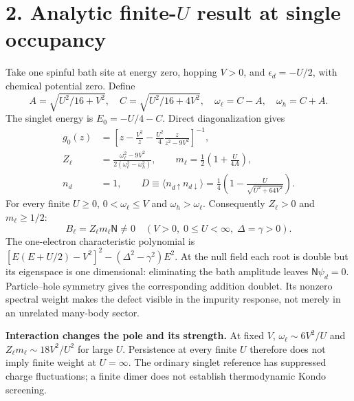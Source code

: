 \documentclass[11pt,a4paper]{article}
\newcommand{\N}{\mathsf N}
\begin{document}
\section*{2. Analytic finite-$U$ result at single occupancy}
Take one spinful bath site at energy zero, hopping $V>0$, and
$\epsilon_d=-U/2$, with chemical potential zero. Define
\begin{equation}
 A=\sqrt{U^2/16+V^2},\quad C=\sqrt{U^2/16+4V^2},\quad
 \omega_\ell=C-A,\quad\omega_h=C+A .
\end{equation}
The singlet energy is $E_0=-U/4-C$. Direct diagonalization gives
\begin{align}
g_0(z)&=\left[z-\frac{V^2}{z}
                -\frac{U^2}{4}\frac{z}{z^2-9V^2}\right]^{-1},\label{eq:g0}\\
Z_\ell&=\frac{\omega_\ell^2-9V^2}
                   {2(\omega_\ell^2-\omega_h^2)},\qquad
m_\ell=\frac12\left(1+\frac{U}{4A}\right),\\
n_d&=1,\qquad
D\equiv\langle n_{d\uparrow}n_{d\downarrow}\rangle
 =\frac14\left(1-\frac{U}{\sqrt{U^2+64V^2}}\right).
\end{align}
For every finite $U\ge0$, $0<\omega_\ell\le V$ and
$\omega_h>\omega_\ell$. Consequently $Z_\ell>0$ and $m_\ell\ge1/2$:
\begin{equation}
 \boxed{B_\ell=Z_\ell m_\ell\N\ne0\quad
        (V>0,\;0\le U<\infty,\;\Delta=\gamma>0).}
\end{equation}
The one-electron characteristic polynomial is
$[E(E+U/2)-V^2]^2-(\Delta^2-\gamma^2)E^2$.
At the null field each root is double but its eigenspace is one dimensional:
eliminating the bath amplitude leaves $\N\psi_d=0$. Particle--hole symmetry
gives the corresponding addition doublet. Its nonzero spectral weight makes
the defect visible in the impurity response, not merely in an unrelated
many-body sector.

\textbf{Interaction changes the pole and its strength.} At fixed $V$,
$\omega_\ell\sim6V^2/U$ and $Z_\ell m_\ell\sim18V^2/U^2$ for large $U$.
Persistence at every finite $U$ therefore does not imply finite weight at
$U=\infty$. The ordinary singlet reference has suppressed charge fluctuations;
a finite dimer does not establish thermodynamic Kondo screening.
\end{document}
